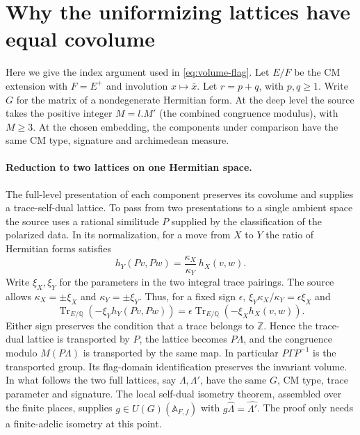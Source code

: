 \section{Why the uniformizing lattices have equal covolume}
\label{sec:selfdual-covol}
Here we give the index argument used in \eqref{eq:volume-flag}.
Let \(E/F\) be the CM extension with \(F=E^+\) and involution
\(x\mapsto\bar x\). Let \(r=p+q\), with \(p,q\ge1\).
Write \(G\) for the matrix of a nondegenerate Hermitian form.
At the deep level the source takes the positive integer \(M=l.M'\)
(the combined congruence modulus), with \(M\ge3\).
At the chosen embedding, the components under comparison have the
same CM type, signature and archimedean measure.

\paragraph{Reduction to two lattices on one Hermitian space.}
The full-level presentation of each component preserves its covolume
and supplies a trace-self-dual lattice. To pass from two presentations
to a single ambient space the source uses a rational similitude
\(P\) supplied by the classification of the polarized data. In its
normalization, for a move from \(X\) to \(Y\) the ratio of Hermitian
forms satisfies
\[
 h_Y(Pv,Pw)=\frac{\kappa_X}{\kappa_Y}\,h_X(v,w).
\]
Write \(\xi_X,\xi_Y\) for the parameters in the two integral trace
pairings. The source allows \(\kappa_X=\pm\xi_X\) and
\(\kappa_Y=\pm\xi_Y\). Thus, for a fixed sign \(\epsilon\),
\(\xi_Y\kappa_X/\kappa_Y=\epsilon\xi_X\) and
\[
 \operatorname{Tr}_{E/\mathbb Q}(-\xi_Y h_Y(Pv,Pw))
   =\epsilon\operatorname{Tr}_{E/\mathbb Q}(-\xi_X h_X(v,w)).
\]
Either sign preserves the condition that a trace belongs to
\(\mathbb Z\). Hence the trace-dual lattice is transported by
\(P\), the lattice becomes \(P\Lambda\), and the congruence
modulo \(M(P\Lambda)\) is transported by the same map. In particular
\(P\Gamma P^{-1}\) is the transported group. Its flag-domain
identification preserves the invariant volume. In what follows the
two full lattices, say \(\Lambda,\Lambda'\), have the same \(G\),
CM type, trace parameter and signature. The local self-dual isometry
theorem, assembled over the finite places, supplies
\(g\in U(G)(\mathbb A_{F,f})\) with
\(g\widehat\Lambda=\widehat{\Lambda'}\). The proof only needs a
finite-adelic isometry at this point.

